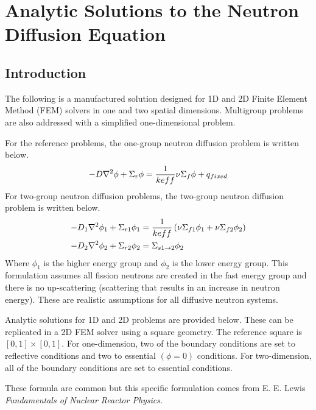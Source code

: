 \chapter{Analytic Solutions to the Neutron Diffusion Equation}

\section{Introduction}
  The following is a manufactured solution designed for 1D and 2D Finite Element 
  Method (FEM) solvers in one and two spatial dimensions. Multigroup 
  problems are also addressed with a simplified one-dimensional problem.
  
  For the reference problems, the one-group neutron diffusion problem is written
  below.
  \begin{equation} \label{eq:onegroup}
    -D \mathbf{\nabla}^2 \phi + \Sigma_r \phi =  \frac{1}{keff} \nu \Sigma_f \phi + 
      q_{fixed}
  \end{equation}
  For two-group neutron diffusion problems, the two-group neutron diffusion 
  problem is written below.
  \begin{align} 
    \label{eq:twogroup1}
    -D_1 \mathbf{\nabla}^2 \phi_1 + \Sigma_{r1} \phi_1 &= \frac{1}{keff} \left(
      \nu \Sigma_{f1} \phi_1 + \nu \Sigma_{f2} \phi_2 \right) \\
    \label{eq:twogroup2}
    -D_2 \mathbf{\nabla}^2 \phi_2 + \Sigma_{r2} \phi_2 &= 
      \Sigma_{s 1 \rightarrow 2} \phi_2
  \end{align}
  Where $\phi_1$ is the higher energy group and $\phi_2$ is the lower energy 
  group. This formulation assumes all fission neutrons are created in the fast 
  energy group and there is no up-scattering (scattering that results in an 
  increase in neutron energy). These are realistic assumptions for all diffusive
  neutron systems.

  Analytic solutions for 1D and 2D problems are provided below. These can be 
  replicated in a 2D FEM solver using a square geometry. The reference square is 
  $[0,1]\times[0,1]$. For one-dimension, two of the boundary conditions are set
  to reflective conditions and two to essential $(\phi = 0)$ conditions. For 
  two-dimension, all of the boundary conditions are set to essential conditions.
  
  These formula are common but this specific formulation comes from E. E. Lewis
  \textit{Fundamentals of Nuclear Reactor Physics}.

